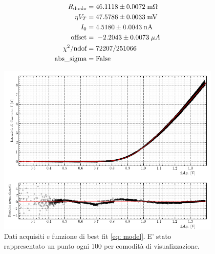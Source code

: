\documentclass{article}[a4paper, oneside, 11pt]
\begin{document}
\begin{align*}
	R_{\text{diodo}} &= 46.1118 \pm 0.0072 \; \rm m\Omega \\
	\eta V_T &= 47.5786 \pm 0.0033 \; \rm mV \\
	I_0 &= 4.5180 \pm 0.0043 \; \rm nA \\
	\text{offset} &=\; - 2.2043\pm 0.0073 \;  \mu A\\
	\chi^2/\text{ndof} &= 72207/251066 \\
	\text{abs\_sigma} &= \rm False
\end{align*}

\begin{figure}[H]%
	\centering 
	\includegraphics[scale=0.7]{diode_linear.png}%
	\caption{Dati acquisiti e funzione di best fit \eqref{eq: model}. E' 
	stato rappresentato un punto ogni 100 per comodità di visualizzazione.
	\label{fig: sck_lin}}
\end{figure}
\end{document}
